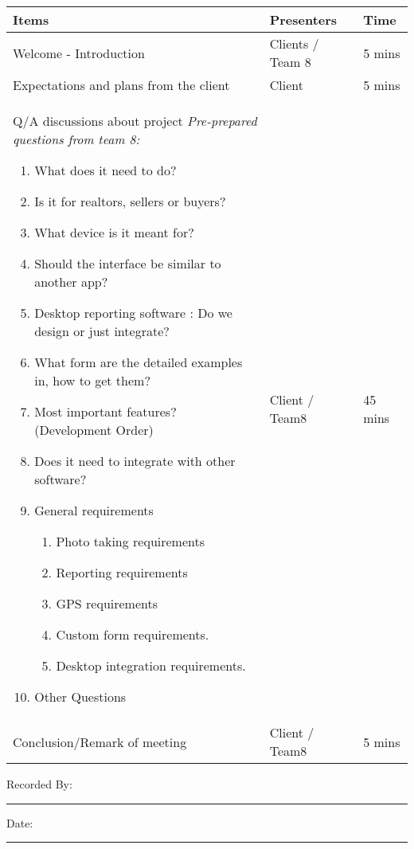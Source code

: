 \documentclass[12pt]{article}
\begin{document}
\def \items {\textbf{Items}}
\def \presenters {\textbf{Presenters}}
\def \time {\textbf{Time}}

\def \presenterA {Clients / Team 8}
\def \presenterB {Client}
\def \presenterC {Client / Team8}
\def \presenterD {Client / Team8}

\def \timeA {5 mins}
\def \timeB {5 mins}
\def \timeC {45 mins}
\def \timeD {5 mins}
 
\def \itemA {Welcome - Introduction}
\def \itemB {Expectations and plans from the client}
\def \itemC {
  Q/A discussions about project\newline\newline
  \emph{Pre-prepared questions from team 8:}
  \begin{enumerate} %
    \item What does it need to do?
    \item Is it for realtors, sellers or buyers?
    \item What device is it meant for?
    \item Should the interface be similar to another app?
    \item Desktop reporting software : Do we design or just integrate?
    \item What form are the detailed examples in, how to get them?
    \item Most important features? (Development Order)
    \item Does it need to integrate with other software?
    \item General requirements
    \begin{enumerate}[label=(\alph*)] %
      \item Photo taking requirements
      \item Reporting requirements
      \item GPS requirements
      \item Custom form requirements.
      \item Desktop integration requirements.
    \end{enumerate}	
    \item Other Questions
  \end{enumerate}
}

\def \itemD {Conclusion/Remark of meeting}
\renewcommand{\arraystretch}{2} %
\begin{tabular}{|p{10cm}|p{3cm}|p{1.5cm}|}
  \hline
  \items&\presenters&\time\\
  \hline
  \itemA&\presenterA&\timeA\\
  \hline
  \itemB&\presenterB&\timeB\\
  \hline
  \itemC&\presenterC&\timeC\\
  \hline
  \itemD&\presenterD&\timeD\\
  \hline
\end{tabular}

\vspace{1cm}
\noindent Recorded By:\noindent\rule{8cm}{0.4pt} Date:\noindent\rule{4cm}{0.4pt}
\end{document}
